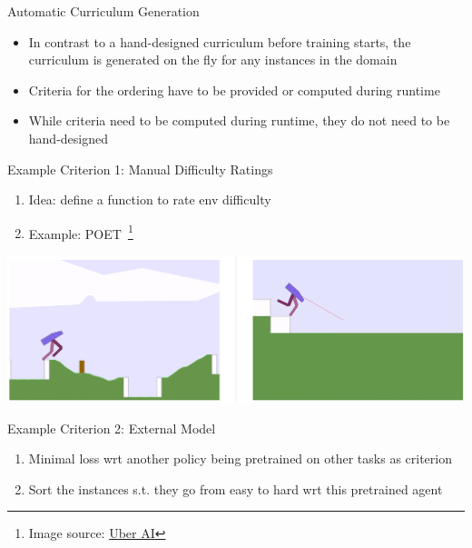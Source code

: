 \begin{frame}[c]{Automatic Curriculum Generation}
	
	\begin{itemize}
		\item In contrast to a hand-designed curriculum before training starts, the curriculum is generated on the fly for any instances in the domain
		\item Criteria for the ordering have to be provided or computed during runtime
		\item While criteria need to be computed during runtime, they do not need to be hand-designed
	\end{itemize}
	
\end{frame}

\begin{frame}[c]{Example Criterion 1: Manual Difficulty Ratings}
	
	\begin{enumerate}
		\item Idea: define a function to rate env difficulty
		\item Example: POET~\footnote{Image source: \href{https://eng.uber.com/poet-open-ended-deep-learning/}{Uber AI}}
	\end{enumerate}
	\centering
	
	\includegraphics[scale=0.5]{images/poet.PNG}			
\end{frame}

\begin{frame}[c]{Example Criterion 2: External Model}
	
	\begin{enumerate}
		\item Minimal loss wrt another policy being pretrained on other tasks as criterion
		\item Sort the instances s.t. they go from easy to hard wrt this pretrained agent~
	\end{enumerate}
	
\end{frame}


